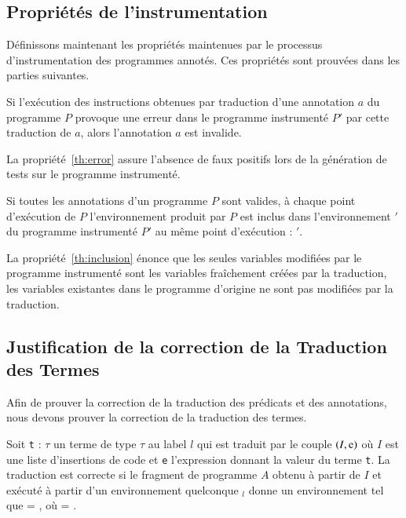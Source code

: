 \subsection{Propriétés de l'instrumentation}
\label{sec:properties}


Définissons maintenant les propriétés maintenues par le processus
d'instrumentation des programmes annotés.
Ces propriétés sont prouvées dans les parties suivantes.


\begin{myproperty}
  \label{th:error}
  Si l'exécution des instructions obtenues par traduction d'une annotation $a$
  du programme $P$ provoque une erreur dans le programme instrumenté $P'$ par
  cette traduction de $a$, alors l'annotation $a$ est invalide.
\end{myproperty}

La propriété~\ref{th:error} assure l'absence de faux positifs lors de la
génération de tests sur le programme instrumenté.

\begin{myproperty}
  \label{th:inclusion}
  Si toutes les annotations d'un programme $P$ sont valides, à chaque point
  d'exécution de $P$ l'environnement \env{} produit par $P$ est inclus dans
  l'environnement \env$'$ du programme instrumenté $P'$ au même point
  d'exécution : \env{} \subenv{} \env$'$.
\end{myproperty}

La propriété~\ref{th:inclusion} énonce que les seules variables modifiées par le
programme instrumenté sont les variables fraîchement créées par la traduction,
les variables existantes dans le programme d'origine ne sont pas modifiées par
la traduction.


\subsection{Justification de la correction de la Traduction des Termes}
\label{sec:term-translation}

Afin de prouver la correction de la traduction des prédicats et des annotations,
nous devons prouver la correction de la traduction des termes.

\begin{myproperty}
  \label{lem:term-correct}
  Soit \lstinline't' : $\tau$ un terme de type $\tau$ au label $l$ qui est
  traduit par le couple $(I, \mbox{\lstinline'e'})$ où $I$ est une liste
  d'insertions de code et \lstinline'e' l'expression donnant la valeur du terme
  \lstinline't'.
  La traduction est correcte si le fragment de programme $A$ obtenu à partir de
  $I$ et exécuté à partir d'un environnement quelconque \env$_l$ donne un
  environnement \env{} tel que
   = , où
  \env = .
\end{myproperty}

